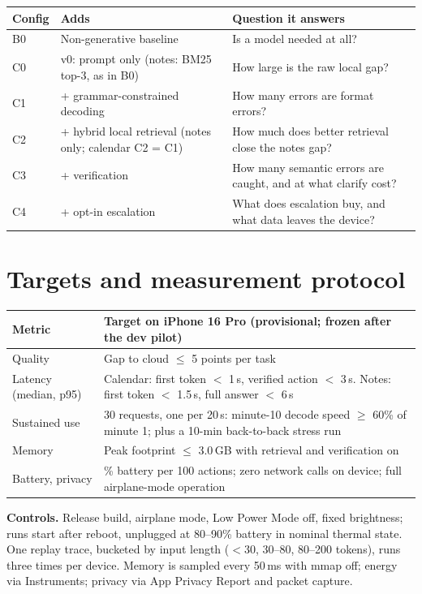 \documentclass[10pt,letterpaper]{article}
\begin{document}
\begin{center}
\small
\begin{tabularx}{\textwidth}{@{}l L L@{}}
\toprule
\textbf{Config} & \textbf{Adds} & \textbf{Question it answers} \\
\midrule
B0 & Non-generative baseline & Is a model needed at all? \\
C0 & v0: prompt only (notes: BM25 top-3, as in B0) & How large is the raw local gap? \\
C1 & + grammar-constrained decoding & How many errors are format errors? \\
C2 & + hybrid local retrieval (notes only; calendar C2 = C1) & How much does better retrieval close the notes gap? \\
C3 & + verification & How many semantic errors are caught, and at what clarify cost? \\
C4 & + opt-in escalation & What does escalation buy, and what data leaves the device? \\
\bottomrule
\end{tabularx}
\end{center}

\section{Targets and measurement protocol}
\begin{center}
\small
\begin{tabularx}{\textwidth}{@{}l L@{}}
\toprule
\textbf{Metric} & \textbf{Target on iPhone 16 Pro (provisional; frozen after the dev pilot)} \\
\midrule
Quality & Gap to cloud $\leq$ 5 points per task \\
Latency (median, p95) & Calendar: first token $<$ 1\,s, verified action $<$ 3\,s. Notes: first token $<$ 1.5\,s, full answer $<$ 6\,s \\
Sustained use & 30 requests, one per 20\,s: minute-10 decode speed $\geq$ 60\% of minute 1; plus a 10-min back-to-back stress run \\
Memory & Peak footprint $\leq$ 3.0\,GB with retrieval and verification on \\
Battery, privacy & \% battery per 100 actions; zero network calls on device; full airplane-mode operation \\
\bottomrule
\end{tabularx}
\end{center}
\textbf{Controls.} Release build, airplane mode, Low Power Mode off, fixed brightness; runs start after reboot, unplugged at 80--90\% battery in nominal thermal state. One replay trace, bucketed by input length ($<$30, 30--80, 80--200 tokens), runs three times per device. Memory is sampled every 50\,ms with mmap off; energy via Instruments; privacy via App Privacy Report and packet capture.
\end{document}
